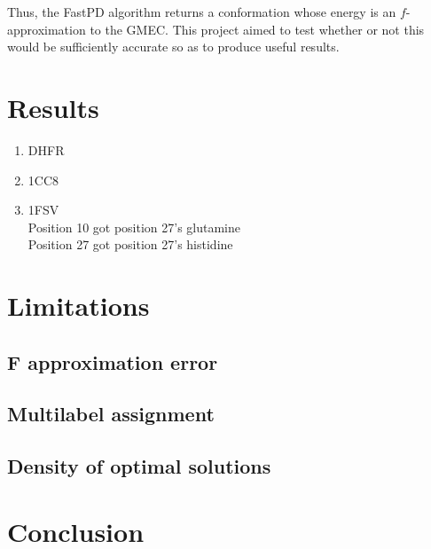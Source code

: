 \documentclass[11pt]{article}
\begin{document}
	Thus, the FastPD algorithm returns a conformation whose energy is an $f$-
	approximation to the GMEC. This project aimed to test whether or not this would
	be sufficiently accurate so as to produce useful results. 

	\section{Results}
	
	\begin{enumerate}
		\item DHFR
		\item 1CC8
		\item 1FSV\\
		Position 10 got position 27's glutamine\\
		Position 27 got position 27's histidine
	\end{enumerate}

	\section{Limitations}
	\subsection{F approximation error}
	\subsection{Multilabel assignment}
	\subsection{Density of optimal solutions}
	\section{Conclusion}
	
\end{document}
